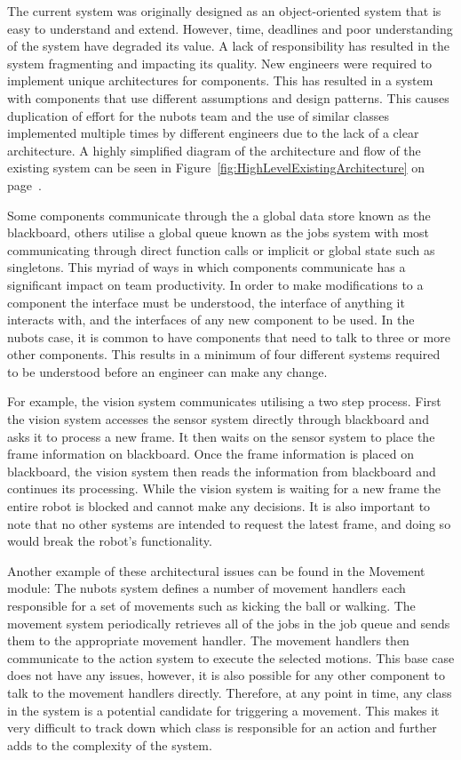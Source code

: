 \documentclass[english,12pt]{scrartcl}
\begin{document}
			The current system was originally designed as an object-oriented system that is easy to understand and extend.
			However, time, deadlines and poor understanding of the system have degraded its value.
			A lack of responsibility has resulted in the system fragmenting and impacting its quality.
			New engineers were required to implement unique architectures for components.
			This has resulted in a system with components that use different assumptions and design patterns.
			This causes duplication of effort for the \gls{nubots} team and the use of similar classes implemented multiple times by different engineers due to the lack of a clear architecture. 
			A highly simplified diagram of the architecture and flow of the existing system can be seen in Figure~\ref{fig:HighLevelExistingArchitecture} on page~\pageref{fig:HighLevelExistingArchitecture}.
			
			Some components communicate through the a global data store known as the blackboard, others utilise a global queue known as the jobs system with most communicating through direct function calls or implicit or global state such as singletons.
			This myriad of ways in which components communicate has a significant impact on team productivity.
			In order to make modifications to a component the interface must be understood, the interface of anything it interacts with, and the interfaces of any new component to be used.
			In the \gls{nubots} case, it is common to have components that need to talk to three or more other components. This results in a minimum of four different systems required to be understood before an engineer can make any change.

			For example, the vision system communicates utilising a two step process.
			First the vision system accesses the sensor system directly through blackboard and asks it to process a new frame.
			It then waits on the sensor system to place the frame information on blackboard. Once the frame information is placed on blackboard, the vision system then reads the information from blackboard and continues its processing.
			While the vision system is waiting for a new frame the entire robot is blocked and cannot make any decisions.
			It is also important to note that no other systems are intended to request the latest frame, and doing so would break the robot’s functionality.

			Another example of these architectural issues can be found in the Movement module:
			The \gls{nubots} system defines a number of movement handlers each responsible for a set of movements such as kicking the ball or walking.
			The movement system periodically retrieves all of the jobs in the job queue and sends them to the appropriate movement handler.
			The movement handlers then communicate to the action system to execute the selected motions.
			This base case does not have any issues, however, it is also possible for any other component to talk to the movement handlers directly.
			Therefore, at any point in time, any class in the system is a potential candidate for triggering a movement.
			This makes it very difficult to track down which class is responsible for an action and further adds to the complexity of the system.
\end{document}
